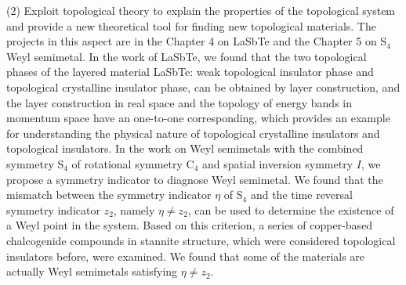 \documentclass[twoside]{Style/ucasthesis}
\begin{document}
(2) Exploit topological theory to explain the properties of the topological system and provide a new theoretical tool for finding new topological materials. The projects in this aspect are in the Chapter 4 on LaSbTe and the Chapter 5 on S$_4$ Weyl semimetal. In the work of LaSbTe, we found that the two topological phases of the layered material LaSbTe: weak topological insulator phase and topological crystalline insulator phase, can be obtained by layer construction, and the layer construction in real space and the topology of energy bands in momentum space have an one-to-one corresponding, which provides an example for understanding the physical nature of topological crystalline insulators and topological insulators. In the work on Weyl semimetals with the combined symmetry  S$_4$ of rotational symmetry C$_4$ and spatial inversion symmetry $I$, we propose a symmetry indicator to diagnose Weyl semimetal. We found that the mismatch between the symmetry indicator $\eta$ of S$_4$ and the time reversal symmetry indicator $z_2$, namely $\eta \neq z_2$, can be used to determine the existence of a Weyl point in the system. Based on this criterion, a series of copper-based chalcogenide compounds in stannite structure, which were considered topological insulators before, were examined. We found that some of the materials are actually Weyl semimetals satisfying $\eta \neq z_2$.






{%
\linespread{1.2}%
\intobmk*{\cleardoublepage}{\contentsname}%
\tableofcontents%
\intobmk*{\cleardoublepage}{\listfigurename}%
\listoffigures%
\intobmk*{\cleardoublepage}{\listtablename}%
\listoftables%
}


\mainmatter%






\cleardoublepage%
\appendix%
\backmatter%
\intotoc*{\cleardoublepage}{\bibname}%
\end{document}
